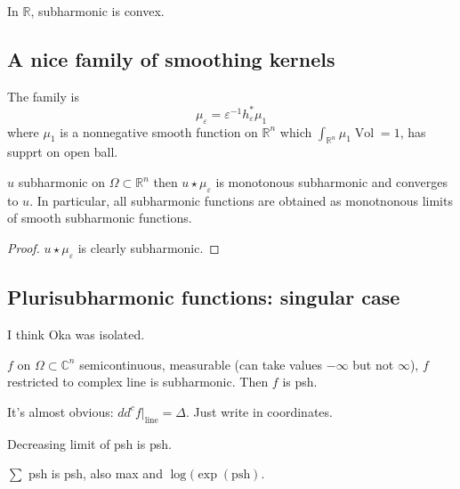 \begin{remark}\leavevmode
In \(\mathbb{R}\), subharmonic is convex.
\end{remark}

\subsection{A nice family of smoothing kernels}

The family is
\[\mu_\varepsilon=\varepsilon^{-1}h_\varepsilon ^*\mu_1\]
where \(\mu_1\) is a nonnegative smooth function on \(\mathbb{R}^n\) which \(\int_{\mathbb{R}^n}\mu_1\operatorname{Vol}=1\), has supprt on open ball.

\begin{thm}\leavevmode
 \(u\) subharmonic on \(\Omega \subset \mathbb{R}^n \) then \(u \star \mu_\varepsilon \) is monotonous subharmonic and converges to \(u\). In particular, all subharmonic functions are obtained as monotnonous limits of smooth subharmonic functions.
\end{thm}

\begin{proof}\leavevmode
\(u \star \mu_\varepsilon\) is clearly subharmonic.
\end{proof}

\subsection{Plurisubharmonic functions: singular case}

I think Oka was isolated.

\begin{defn}\leavevmode
\(f\) on \(\Omega \subset \mathbb{C}^n\) semicontinuous, measurable (can take values \(-\infty\) but not \(\infty\)), \(f\) restricted to complex line is subharmonic. Then \(f\) is psh.
\end{defn}

\begin{exercise}\leavevmode
It's almost obvious: \(d d^c f |_{\text{line} }=\Delta\). Just write in coordinates.
\end{exercise}

\begin{claim}\leavevmode
Decreasing limit of psh is psh.
\end{claim}

\begin{claim}\leavevmode
\(\sum\) psh is psh, also max and \(\operatorname{log}(\operatorname{exp}(\text{psh} )\).
\end{claim}

